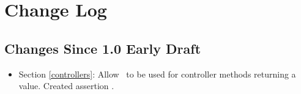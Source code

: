 \chapter{Change Log}

\section{Changes Since 1.0 Early Draft}

\begin{itemize}
\item Section \ref{controllers}: Allow \View\ to be used for controller methods returning a 
 value. Created assertion .
\end{itemize}
